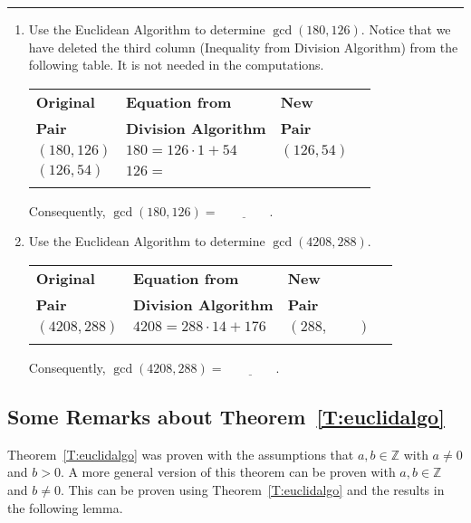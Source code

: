 \hrule
%
\begin{prog}\label{prog:usingeuclid} \hfill
\begin{enumerate}
\item Use the Euclidean Algorithm to determine  $\gcd( {180, 126} )$.  Notice that we have deleted the third column (Inequality from Division Algorithm) from the following table.  It is not needed in the computations.

\begin{center}
\begin{tabular}[h]{| l | l | l | l |}
  \hline
  \textbf{Original}  &  \textbf{Equation from}    &  \textbf{New}    \\
  \textbf{Pair}     &  \textbf{Division Algorithm} &  \textbf{Pair}  \\ \hline
$\left( {180, 126} \right)$  &  	$180 = 126 \cdot 1  + 54 $  &  $\left( {126, 54} \right)$  \\ \hline
$\left( {126, 54} \right)$  &  $126 = $   &      \\ \hline
                            &             &	  \\ \hline
\end{tabular}
\end{center}
Consequently,  $\gcd( {180, 126} ) = \underline{\qquad \qquad}$.

\item Use the Euclidean Algorithm to determine $\gcd( {4208, 288} )$.
\begin{center}
\begin{tabular}[h]{| l | l | l | l |}
  \hline
  \textbf{Original}  &  \textbf{Equation from}    &  \textbf{New}    \\
  \textbf{Pair}     &  \textbf{Division Algorithm} &  \textbf{Pair}  \\ \hline
$\left( {4208, 288} \right)$  &  	$4208 = 288 \cdot 14  + 176 $  &  $\left( {288, \qquad} \right)$  \\ \hline
                            &             &	  \\ \hline
\end{tabular}
\end{center}
Consequently,  $\gcd( {4208, 288} ) = \underline{\qquad \qquad}$.
\end{enumerate}
\end{prog}
\hbreak

\subsection*{Some Remarks about Theorem~\ref{T:euclidalgo}}
Theorem~\ref{T:euclidalgo} was proven with the assumptions that  $a, b \in \mathbb{Z}$  with  
$a \ne 0$  and  $b > 0$.  A more general version of this theorem can be proven with  
$a, b \in \mathbb{Z}$ and  $b \ne 0$.  This can be proven using Theorem~\ref{T:euclidalgo} and the results in the following lemma.

